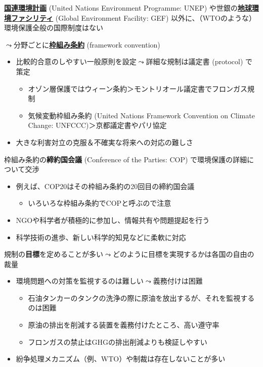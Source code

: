 \documentclass[
  xelatex,
  ja=standard]{bxjsarticle}
\providecommand{\tightlist}{%
  \setlength{\itemsep}{0pt}\setlength{\parskip}{0pt}}\usepackage{longtable,booktabs,array}
\begin{document}
\href{https://www.mofa.go.jp/mofaj/gaiko/kankyo/kikan/unep.html}{\textbf{国連環境計画}}
(United Nations Environment Programme: UNEP)
や世銀の\href{https://www.mofa.go.jp/mofaj/gaiko/kankyo/kikan/gbl_env.html}{\textbf{地球環境ファシリティ}}
(Global Environment Facility: GEF)
以外に、（WTOのような）環境保護全般の国際制度はない

\(\leadsto\)分野ごとに\href{https://www.mofa.go.jp/mofaj/files/000135675.pdf}{\textbf{枠組み条約}}
(framework convention)

\begin{itemize}
\tightlist
\item
  比較的合意のしやすい一般原則を設定\(\leadsto\)詳細な規制は議定書
  (protocol) で策定

  \begin{itemize}
  \tightlist
  \item
    オゾン層保護ではウィーン条約＞モントリオール議定書でフロンガス規制
  \item
    気候変動枠組み条約 (United Nations Framework Convention on Climate
    Change: UNFCCC)＞京都議定書やパリ協定
  \end{itemize}
\item
  大きな利害対立の克服＆不確実な将来への対応の難しさ
\end{itemize}

枠組み条約の\textbf{締約国会議} (Conference of the Parties: COP)
で環境保護の詳細について交渉

\begin{itemize}
\tightlist
\item
  例えば、COP20はその枠組み条約の20回目の締約国会議

  \begin{itemize}
  \tightlist
  \item
    いろいろな枠組み条約でCOPと呼ぶので注意
  \end{itemize}
\item
  NGOや科学者が積極的に参加し、情報共有や問題提起を行う
\item
  科学技術の進歩、新しい科学的知見などに柔軟に対応
\end{itemize}

規制の\textbf{目標}を定めることが多い\(\leadsto\)どのように目標を実現するかは各国の自由の裁量

\begin{itemize}
\tightlist
\item
  環境問題への対策を監視するのは難しい\(\leadsto\)義務付けは困難

  \begin{itemize}
  \tightlist
  \item
    石油タンカーのタンクの洗浄の際に原油を放出するが、それを監視するのは困難
  \item
    原油の排出を削減する装置を義務付けたところ、高い遵守率\citep{mitchell1994}
  \item
    フロンガスの禁止はGHGの排出削減よりも検証しやすい
  \end{itemize}
\item
  紛争処理メカニズム（例、WTO）や制裁は存在しないことが多い
\end{itemize}
\end{document}
